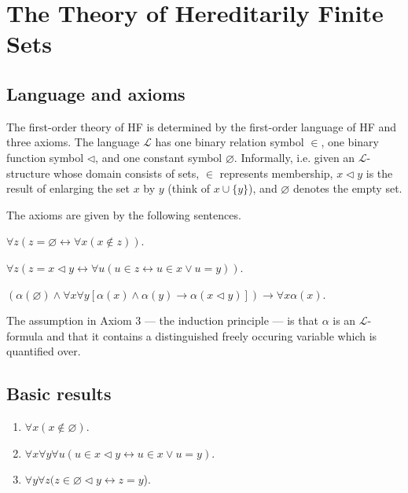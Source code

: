 \section{The Theory of Hereditarily Finite Sets}

\subsection{Language and axioms}

The first-order theory of HF is determined by the first-order language of HF and three axioms.
The language $\mathcal{L}$ has one binary relation symbol $\in$, one binary function symbol $\lhd$, and one constant symbol $\varnothing$.
Informally, i.e. given an $\mathcal{L}$-structure whose domain consists of sets,  $\in$ represents membership, $x \lhd y$ is the result of
enlarging the set $x$ by $y$ (think of $x \cup \{y\}$), and $\varnothing$ denotes the empty set.

The axioms are given by the following sentences.

\begin{axiom}
    \label{ax:empty}
    \leanok
    $\forall z (z=\varnothing \leftrightarrow \forall x(x \notin z))$.
\end {axiom}

\begin{axiom}
    \label{ax:enlarge}
    \leanok
    $\forall z (z=x \lhd y \leftrightarrow \forall u(u \in z \leftrightarrow u \in x \lor u=y))$.
\end {axiom}

\begin{axiom}
    \label{ax:induction}
    \leanok
    $(\alpha(\varnothing) \land \forall x \forall y[\alpha(x) \land \alpha(y) \rightarrow \alpha(x \lhd y)]) \rightarrow \forall x \alpha(x)$.
\end {axiom}

The assumption in Axiom 3 — the induction principle — is that $\alpha$ is an $\mathcal{L}$-formula
and that it contains a distinguished freely occuring variable which is quantified over.

\subsection{Basic results}

\begin{lemma}
    \label{lem:one}
    \leanok
    \leavevmode \normalfont
    \begin{enumerate}
        \item $\forall x (x\notin \varnothing)$.
        \item $\forall x \forall y \forall u (u \in x \lhd y \leftrightarrow u \in x \lor u=y)$.
        \item $\forall y \forall z (z\in \varnothing \lhd y \leftrightarrow z = y$).
    \end{enumerate}
\end{lemma}

